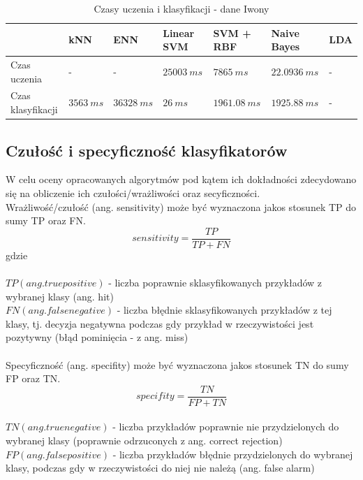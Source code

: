 \documentclass[[10pt,a4paper]{article}
\begin{document}
\begin{table}[h]
\centering
\caption{Czasy uczenia i klasyfikacji  - dane Iwony}
\label{timesTable2}
\begin{tabular}{l|l|l|l|l|l|l|}
\cline{2-7}
                                        & kNN & ENN & Linear SVM & SVM + RBF & Naive Bayes & LDA \\ \hline
\multicolumn{1}{|l|}{Czas uczenia}      &  -  &  -   &  $25003\: ms$   &   $7865\: ms$   &   $22.0936 \: ms$ & -    \\ \hline
\multicolumn{1}{|l|}{Czas klasyfikacji} &  $3563 \: ms$   &   $36328\: ms$   &   $26\: ms$  &      $1961.08\: ms$     &     $1925.88\: ms$        & - \\ \hline
\end{tabular}
\end{table}

\subsection{Czułość i specyficzność klasyfikatorów}

W celu oceny opracowanych algorytmów pod kątem ich dokładności zdecydowano się na obliczenie ich czułości/wrażliwości oraz secyficzności.\\

Wrażliwość/czułość (ang. sensitivity) może być wyznaczona jakos stosunek TP do sumy TP oraz FN.
 $$
sensitivity = \frac{TP}{TP + FN}
$$
gdzie\\
\\
$TP (ang. true positive)$ - liczba poprawnie sklasyfikowanych przykładów z wybranej klasy (ang. hit)\\
$FN (ang. false negative)$ - liczba błędnie sklasyfikowanych przykładów z tej klasy, tj. decyzja negatywna podczas gdy przykład w rzeczywistości jest pozytywny (błąd pominięcia - z ang. miss)\\
\\
Specyficzność (ang. specifity) może być wyznaczona jakos stosunek TN do sumy FP oraz TN.\\
 $$
specifity = \frac{TN}{FP + TN}
$$
\\
$TN (ang. true negative)$ - liczba przykładów poprawnie nie przydzielonych do wybranej klasy (poprawnie odrzuconych z ang. correct rejection)\\
$FP (ang. false positive)$ - liczba przykładów błędnie przydzielonych do wybranej klasy, podczas gdy w rzeczywistości do niej nie należą (ang. false alarm)\\
\end{document}
